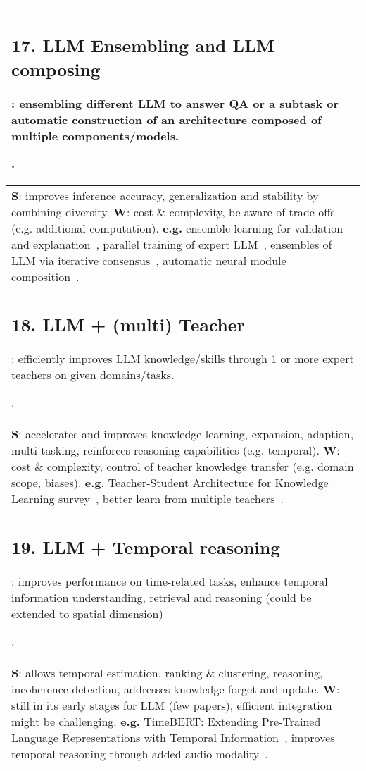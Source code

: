 \documentclass[acmsmall]{acmart}
\begin{document}
{\begin{longtable}{p{1\linewidth}}
{\subsection{17. LLM Ensembling and LLM composing}\label{HP17}:
ensembling different LLM to answer QA or a subtask or automatic construction of an architecture composed of multiple components/models.}. \\\midrule
{\textbf{S}: improves inference accuracy, generalization and stability by combining diversity.
 \newline \textbf{W}:} cost \& complexity, be aware of trade-offs (e.g. additional computation).
 \newline \textbf{e.g.} ensemble learning for validation and explanation~\citep{huyAutoencodingLanguageModel2022},
    parallel training of expert LLM~\citep{liBranchTrainMergeEmbarrassinglyParallel2022},
    ensembles of LLM via iterative consensus~\citep{liComposingEnsemblesPretrained2022}, automatic neural module composition~\citep{andreasNeuralModuleNetworks2017}. \\\midrule

{\subsection{18. LLM + (multi) Teacher}\label{HP18}:
efficiently improves LLM knowledge/skills through 1 or more expert teachers on given domains/tasks.}. \\\midrule  
{\textbf{S}: accelerates and improves knowledge learning, expansion, adaption, multi-tasking, reinforces reasoning capabilities (e.g. temporal).
\newline \textbf{W}:} cost \& complexity, control of teacher knowledge transfer (e.g. domain scope, biases). \newline \textbf{e.g.} Teacher-Student Architecture for Knowledge Learning survey~\citep{huTeacherStudentArchitectureKnowledge2022}, better learn from multiple teachers~\citep{wuOneTeacherEnough2021}. \\\midrule

{\subsection{19. LLM + Temporal reasoning}\label{HP19}:
improves performance on time-related tasks, enhance temporal information understanding, retrieval and reasoning  (could be extended to spatial dimension)}. \\\midrule
{\textbf{S}: allows temporal estimation, ranking \& clustering, reasoning, incoherence detection, addresses knowledge forget and update.
\newline \textbf{W}:} still in its early stages for LLM (few papers), efficient integration might be challenging.
\newline \textbf{e.g.} TimeBERT: Extending Pre-Trained Language Representations with Temporal Information~\citep{wangTimeBERTExtendingPreTrained2022}, improves temporal reasoning through added audio modality~\citep{fayekTemporalReasoningAudio2020}. \\\midrule
\end{longtable}}
\end{document}
